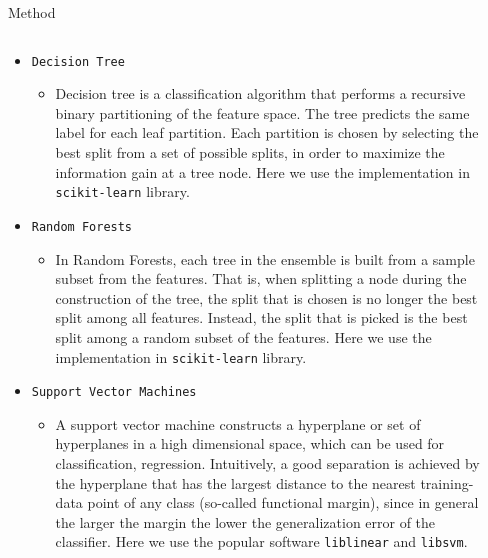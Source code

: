 \documentclass[final,hyperref={pdfpagelabels=false}]{beamer}
\begin{document}
\begin{frame}[t]
\begin{columns}[t]
\begin{column}{.465\textwidth}
\begin{block}{Method}
\begin{columns}
\begin{column}{.5\textwidth}
\begin{itemize}
\item \texttt{Decision Tree} \\
	\begin{itemize}
		\item 
		Decision tree is a classification algorithm that performs a recursive binary partitioning of the feature space. The tree predicts the same label for each leaf partition. Each partition is chosen by selecting the best split from a set of possible splits, in order to maximize the information gain at a tree node. Here we  use the implementation in \texttt{scikit-learn} \cite{scikit-learn} library.
	\end{itemize}
\item \texttt{Random Forests} \\
	\begin{itemize}
		\item In Random Forests, each tree in the ensemble is built from a sample subset from the features. That is, when splitting a node during the construction of the tree, the split that is chosen is no longer the best split among all features. Instead, the split that is picked is the best split among a random subset of the features. Here we use the implementation in \texttt{scikit-learn} library.
	\end{itemize}


	
	
\item \texttt{Support Vector Machines} \\
\begin{itemize}
\item A support vector machine constructs a hyperplane or set of hyperplanes in a high dimensional space, which can be used for classification, regression. Intuitively, a good separation is achieved by the hyperplane that has the largest distance to the nearest training-data point of any class (so-called functional margin), since in general the larger the margin the lower the generalization error of the classifier. Here we use the popular software \texttt{liblinear}\cite{REF08a} and \texttt{libsvm}\cite{CC01a}.
\end{itemize}
	
\end{itemize}

\end{column}

\begin{column}{.4\textwidth}


\end{column}
\end{columns}
\end{block}
\end{column}
\end{columns}
\end{frame}
\end{document}
